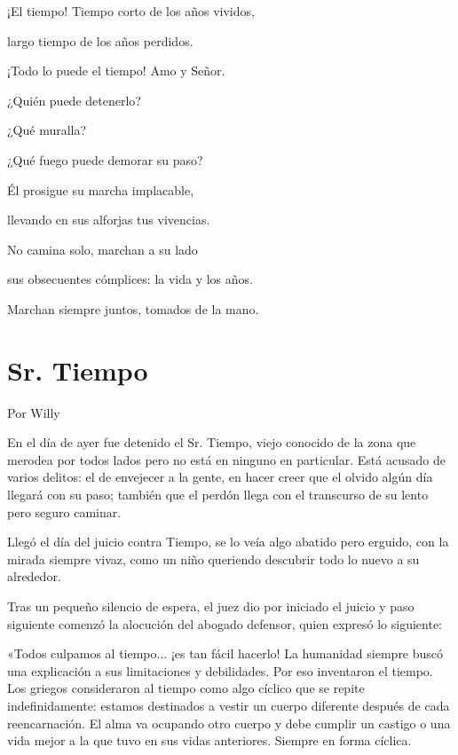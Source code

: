 \documentclass[11pt,twoside,openright,a5paper]{book}
\begin{document}
¡El tiempo! Tiempo corto de los años vividos,

largo tiempo de los años perdidos.

¡Todo lo puede el tiempo! Amo y Señor.

¿Quién puede detenerlo?

¿Qué muralla?

¿Qué fuego puede demorar su paso?

Él prosigue su marcha implacable,

llevando en sus alforjas tus vivencias.

No camina solo, marchan a su lado

sus obsecuentes cómplices: la vida y los años.

Marchan siempre juntos, tomados de la mano.

\section*{Sr. Tiempo}
                                                                                           \begin{flushright}Por Willy\end{flushright}

En el día de ayer fue detenido el Sr. Tiempo, viejo conocido de la zona que merodea por todos lados pero no está en ninguno en particular. Está acusado de varios delitos: el de envejecer a la gente, en hacer creer que el olvido algún día llegará con su paso; también que el perdón llega con el transcurso de su lento pero seguro caminar.

Llegó el día del juicio contra Tiempo, se lo veía algo abatido pero erguido, con la mirada siempre vivaz, como un niño queriendo descubrir todo lo nuevo a su alrededor. 

Tras un pequeño silencio de espera, el juez dio por iniciado el juicio y paso siguiente comenzó la alocución del abogado defensor, quien expresó lo siguiente: 

«Todos culpamos al tiempo... ¡es tan fácil hacerlo! La humanidad siempre buscó una explicación a sus limitaciones y debilidades. Por eso inventaron el tiempo. Los griegos consideraron al tiempo como algo cíclico que se repite indefinidamente: estamos destinados a vestir un cuerpo diferente después de cada reencarnación. El alma va ocupando otro cuerpo y debe cumplir un castigo o una vida mejor a la que tuvo en sus vidas anteriores. Siempre en forma cíclica.
\end{document}
